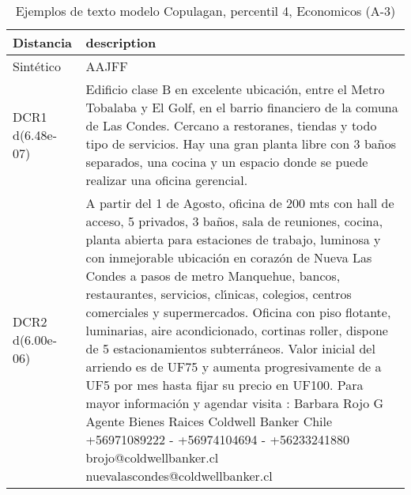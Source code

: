 \begin{table}[H]
\centering
\fontsize{10}{14}\selectfont
\caption{Ejemplos de texto modelo Copulagan, percentil 4, Economicos (A-3)}
\label{table-example-economicos-a-3-copulagan-4p-text}
\begin{tabular}{|l|m{35em}|}
\hline
\rowcolor[gray]{0.8}
Distancia & description \\
\hline Sintético & AAJFF \\
\hline DCR1 d(6.48e-07) & Edificio clase B en excelente ubicaci\'on, entre el Metro Tobalaba y El Golf, en el barrio financiero de la comuna de Las Condes. Cercano a restoranes, tiendas y todo tipo de servicios.  Hay una gran planta libre con 3 ba\~nos separados, una cocina y un espacio donde se puede realizar una oficina gerencial. \\
\hline DCR2 d(6.00e-06) & A partir del 1 de Agosto, oficina de 200 mts con hall de acceso, 5 privados, 3 ba\~nos, sala de reuniones, cocina, planta abierta para estaciones de trabajo, luminosa y con inmejorable ubicaci\'on en coraz\'on de Nueva Las Condes a pasos de metro Manquehue, bancos, restaurantes, servicios, cl{\'\i}nicas, colegios, centros comerciales y supermercados.
Oficina con piso flotante, luminarias, aire acondicionado, cortinas roller, dispone de 5 estacionamientos subterr\'aneos.
Valor inicial del arriendo es de UF75 y aumenta progresivamente de a UF5 por mes hasta fijar su precio en UF100.
Para mayor informaci\'on y agendar visita :
Barbara Rojo G
 Agente Bienes Raices
 Coldwell Banker Chile
+56971089222 - +56974104694 - +56233241880
 brojo@coldwellbanker.cl
nuevalascondes@coldwellbanker.cl \\
\hline
\end{tabular}
\end{table}
